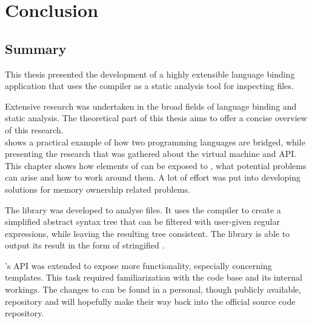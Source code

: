 \part{\hspace{5pt}Conclusion}
\chapter{Summary}
\label{chap:Summary}



This thesis presented the development of a highly extensible language binding application that uses the  compiler as a static analysis tool for inspecting  files.

Extensive research was undertaken in the broad fields of language binding and static analysis. The theoretical part of this thesis aims to offer a concise overview of this research.\\
 shows a practical example of how two programming languages are bridged, while presenting the research that was gathered about the   virtual machine and API. This chapter shows how elements of  can be exposed to , what potential problems can arise and how to work around them. A lot of effort was put into developing solutions for memory ownership related problems.

The  library was developed to analyse  files. It uses the  compiler to create a simplified abstract syntax tree that can be filtered with user-given regular expressions, while leaving the resulting tree consistent. The library is able to output its result in the form of stringified .

's  API was extended to expose more  functionality, especially concerning  templates. This task required familiarization with the  code base and its internal workings. The changes to  can be found in a personal, though publicly available,  repository and will hopefully make their way back into the official  source code repository.

